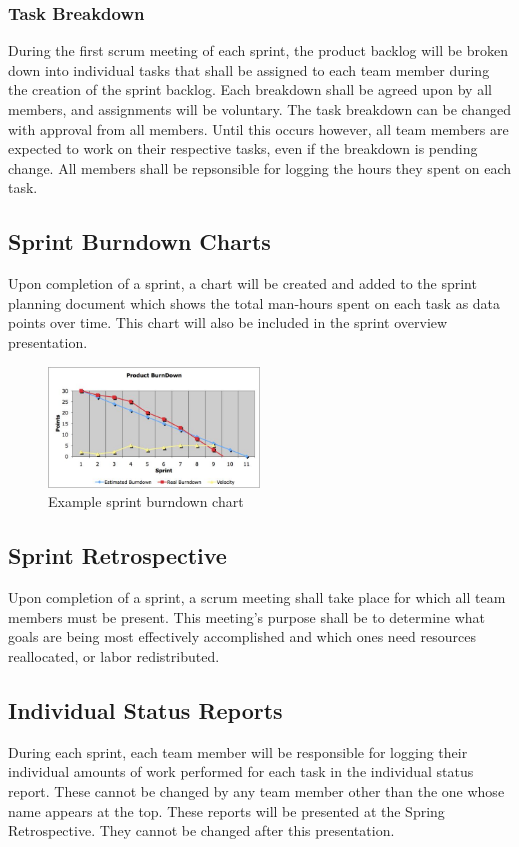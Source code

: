 \subsubsection{Task Breakdown}
During the first scrum meeting of each sprint, the product backlog will be broken down into individual tasks that shall be assigned to each team member during the creation of the sprint backlog. Each breakdown shall be agreed upon by all members, and assignments will be voluntary. The task breakdown can be changed with approval from all members. Until this occurs however, all team members are expected to work on their respective tasks, even if the breakdown is pending change. All members shall be repsonsible for logging the hours they spent on each task.

\subsection{Sprint Burndown Charts}
Upon completion of a sprint, a chart will be created and added to the sprint planning document which shows the total man-hours spent on each task as data points over time. This chart will also be included in the sprint overview presentation.

\begin{figure}[h!]
    \centering
    \includegraphics[width=0.5\textwidth]{images/burndown.jpg}
    \caption{Example sprint burndown chart}
\end{figure}

\subsection{Sprint Retrospective}
Upon completion of a sprint, a scrum meeting shall take place for which all team members must be present. This meeting's purpose shall be to determine what goals are being most effectively accomplished and which ones need resources reallocated, or labor redistributed.

\subsection{Individual Status Reports}
During each sprint, each team member will be responsible for logging their individual amounts of work performed for each task in the individual status report. These cannot be changed by any team member other than the one whose name appears at the top. These reports will be presented at the Spring Retrospective. They cannot be changed after this presentation.

